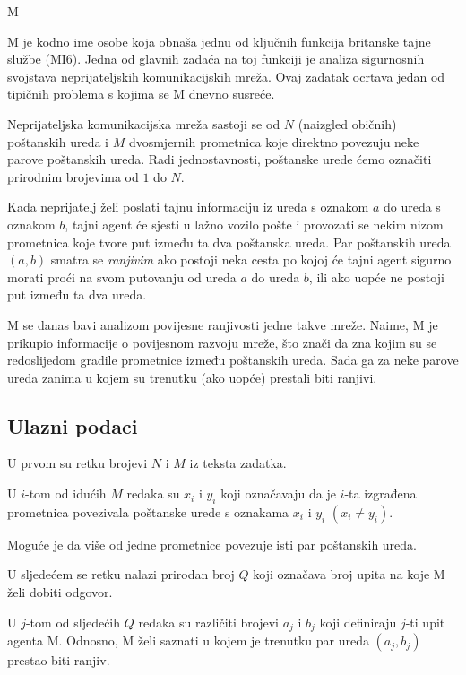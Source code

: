 \begin{statement}[
  problempoints=100,
  timelimit=3 sekunde,
  memorylimit=512 MiB,
]{M}

M je kodno ime osobe koja obnaša jednu od ključnih funkcija britanske tajne
službe (MI6). Jedna od glavnih zadaća na toj funkciji je analiza sigurnosnih
svojstava neprijateljskih komunikacijskih mreža. Ovaj zadatak ocrtava jedan
od tipičnih problema s kojima se M dnevno susreće.

Neprijateljska komunikacijska mreža sastoji se od $N$ (naizgled običnih)
poštanskih ureda i $M$ dvosmjernih prometnica koje direktno povezuju neke
parove poštanskih ureda. Radi jednostavnosti, poštanske urede ćemo označiti
prirodnim brojevima od $1$ do $N$.

Kada neprijatelj želi poslati tajnu informaciju iz ureda s oznakom $a$ do ureda
s oznakom $b$, tajni agent će sjesti u lažno vozilo pošte i provozati se
nekim nizom prometnica koje tvore put između ta dva poštanska ureda.  Par
poštanskih ureda $(a, b)$ smatra se \textit{ranjivim} ako postoji neka cesta
po kojoj će tajni agent sigurno morati proći na svom putovanju od ureda $a$
do ureda $b$, ili ako uopće ne postoji put između ta dva ureda.

M se danas bavi analizom povijesne ranjivosti jedne takve mreže. Naime, M je
prikupio informacije o povijesnom razvoju mreže, što znači da zna kojim su se
redoslijedom gradile prometnice između poštanskih ureda. Sada ga za neke
parove ureda zanima u kojem su trenutku (ako uopće) prestali biti ranjivi.


\subsection*{Ulazni podaci}
U prvom su retku brojevi $N$ i $M$ iz teksta zadatka.

U $i$-tom od idućih $M$ redaka su $x_i$ i $y_i$ koji označavaju
da je $i$-ta izgrađena prometnica povezivala poštanske urede s oznakama $x_i$ i
$y_i$ $(x_i \ne y_i)$.

Moguće je da više od jedne prometnice povezuje isti par poštanskih ureda.

U sljedećem se retku nalazi prirodan broj $Q$ koji označava broj upita na koje
M želi dobiti odgovor.

U $j$-tom od sljedećih $Q$ redaka su različiti brojevi $a_j$ i $b_j$ koji definiraju
$j$-ti upit agenta M. Odnosno, M želi saznati u kojem je trenutku par ureda
$(a_j, b_j)$ prestao biti ranjiv.


\end{statement}
